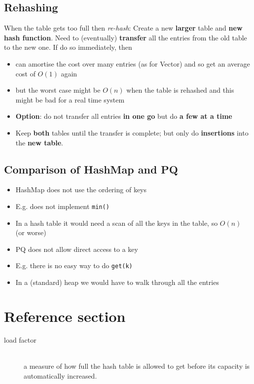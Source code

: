 \documentclass{article}
\begin{document}
\subsection{Rehashing}
\begin{flushleft}
When the table gets too full then \textit{re-hash}: Create a new \textbf{larger} table and \textbf{new hash function}. Need to (eventually) \textbf{transfer} all the entries from the old table to the new one. If do so immediately, then
\begin{itemize}
	\item can amortise the cost over many entries (as for Vector) and so get an average cost of $O(1)$ again
	\item but the worst case might be $O(n)$ when the table is rehashed and this might be bad for a real time system
	\item \textbf{Option}: do not transfer all entries \textbf{in one go} but do \textbf{a few at a time}
	\item Keep \textbf{both} tables until the transfer is complete; but only do \textbf{insertions} into the \textbf{new table}.
\end{itemize}
\end{flushleft}

\subsection{Comparison of HashMap and PQ}
\begin{itemize}
	\item HashMap does not use the ordering of keys
	\item E.g. does not implement \texttt{min()}
	\item In a hash table it would need a scan of all the keys in the table, so $O(n)$ (or worse)
\end{itemize}
\smallskip
\begin{itemize}
	\item PQ does not allow direct access to a key
	\item E.g. there is no easy way to do \texttt{get(k)}
	\item In a (standard) heap we would have to walk through all the entries
\end{itemize}

\pagebreak
\section*{Reference section} \label{sec:reference}
\begin{description}
	\item[load factor] \hfill \\ a measure of how full the hash table is allowed to get before its capacity is automatically increased.
\end{description}
\end{document}
